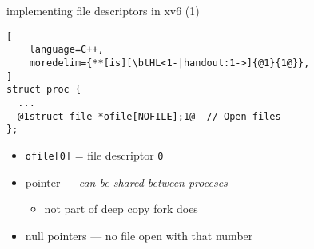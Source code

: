 \begin{frame}[fragile,label=xv6FDs]{implementing file descriptors in xv6 (1)}
\begin{lstlisting}[
    language=C++,
    moredelim={**[is][\btHL<1-|handout:1->]{@1}{1@}},
]
struct proc {
  ...
  @1struct file *ofile[NOFILE];1@  // Open files
};
\end{lstlisting}
\begin{itemize}
\item \texttt{ofile[0]} = file descriptor \texttt{0}
\item pointer --- \textit{can be shared between proceses}
    \begin{itemize}
    \item not part of deep copy fork does
    \end{itemize}
\item null pointers --- no file open with that number
\end{itemize}
\end{frame}

